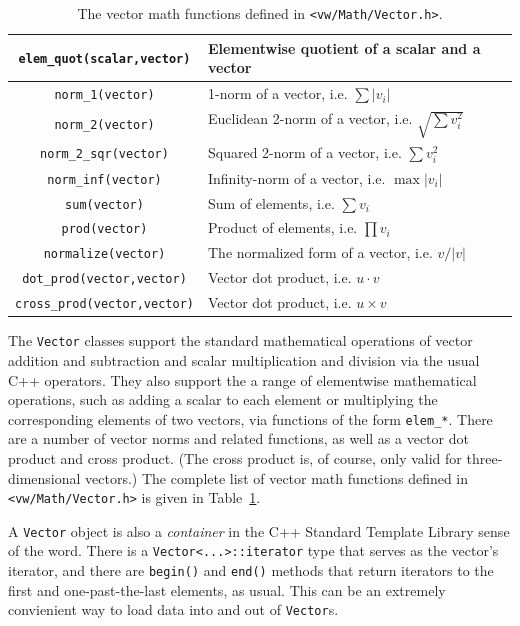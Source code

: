 \begin{table}[t!]
\begin{centering}
\begin{tabular}{|c|l|}
\verb#elem_quot(scalar,vector)# & Elementwise quotient of a scalar and a vector \\ \hline
\hline
\verb#norm_1(vector)# & 1-norm of a vector, i.e. $\sum |v_i|$ \\ \hline
\verb#norm_2(vector)# & Euclidean 2-norm of a vector, i.e. $\sqrt{\sum v_i^2}$ \\ \hline
\verb#norm_2_sqr(vector)# & Squared 2-norm of a vector, i.e. $\sum v_i^2$ \\ \hline
\verb#norm_inf(vector)# & Infinity-norm of a vector, i.e. $\max |v_i|$ \\ \hline
\verb#sum(vector)# & Sum of elements, i.e. $\sum v_i$ \\ \hline
\verb#prod(vector)# & Product of elements, i.e. $\prod v_i$ \\ \hline
\verb#normalize(vector)# & The normalized form of a vector, i.e. $v/|v|$ \\ \hline
\verb#dot_prod(vector,vector)# & Vector dot product, i.e. $u\cdot v$ \\ \hline
\verb#cross_prod(vector,vector)# & Vector dot product, i.e. $u\times v$ \\ \hline
\end{tabular}
\caption{The vector math functions defined in {\tt <vw/Math/Vector.h>}.}
\label{tbl:vector-functions}
\end{centering}\end{table}

The \verb#Vector# classes support the standard mathematical operations
of vector addition and subtraction and scalar multiplication and
division via the usual C++ operators.  They also support the a range
of elementwise mathematical operations, such as adding a scalar to
each element or multiplying the corresponding elements of two vectors,
via functions of the form \verb#elem_*#.  There are a number of vector
norms and related functions, as well as a vector dot product and cross
product.  (The cross product is, of course, only valid for
three-dimensional vectors.)  The complete list of vector math
functions defined in \verb#<vw/Math/Vector.h># is given in
Table~\ref{tbl:vector-functions}.

A \verb#Vector# object is also a {\em container} in the C++ Standard Template 
Library sense of the word.  There is a \verb#Vector<...>::iterator# type 
that serves as the vector's iterator, and there are \verb#begin()# and 
\verb#end()# methods that return iterators to the first and one-past-the-last 
elements, as usual.  This can be an extremely convienient way to load 
data into and out of \verb#Vector#s.

